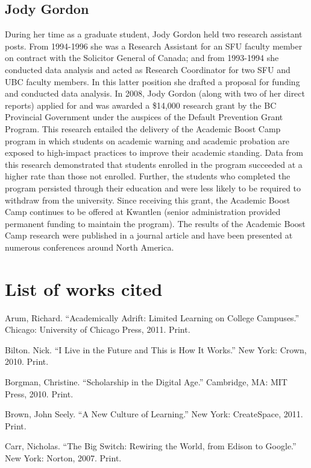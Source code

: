 \documentclass[letterpaper,10pt,headsepline]{scrreprt}
\begin{document}
\subsection{Jody Gordon}

During her time as a graduate student, Jody Gordon held two research assistant
posts. From 1994-1996 she was a Research Assistant for an SFU faculty member
on contract with the Solicitor General of Canada; and from 1993-1994 she
conducted data analysis and acted as Research Coordinator for two SFU and UBC
faculty members. In this latter position she drafted a proposal for funding
and conducted data analysis. In 2008, Jody Gordon (along with two of her
direct reports) applied for and was awarded a \$14,000 research grant by the
BC Provincial Government under the auspices of the Default Prevention Grant
Program. This research entailed the delivery of the Academic Boost Camp
program in which students on academic warning and academic probation are
exposed to high-impact practices to improve their academic standing. Data from
this research demonstrated that students enrolled in the program succeeded at
a higher rate than those not enrolled. Further, the students who completed the
program persisted through their education and were less likely to be required
to withdraw from the university. Since receiving this grant, the Academic
Boost Camp continues to be offered at Kwantlen (senior administration provided
permanent funding to maintain the program). The results of the Academic Boost
Camp research were published in a journal article and have been presented at
numerous conferences around North America.

\section{List of works cited}

Arum, Richard. ``Academically Adrift: Limited Learning on College Campuses.'' Chicago: University of Chicago Press, 2011. Print.

Bilton. Nick. ``I Live in the Future and This is How It Works.'' New York: Crown, 2010. Print.

Borgman, Christine. ``Scholarship in the Digital Age.'' Cambridge, MA: MIT Press, 2010. Print.

Brown, John Seely. ``A New Culture of Learning.'' New York: CreateSpace, 2011. Print.

Carr, Nicholas. ``The Big Switch: Rewiring the World, from Edison to Google.'' New York: Norton, 2007. Print.
\end{document}
